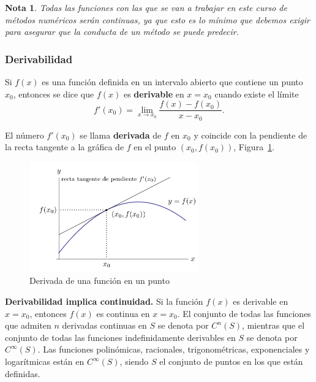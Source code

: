 \documentclass[12pt]{article}
\newtheorem{Note}{Nota}%
\begin{document}
\begin{Note}
Todas las funciones con las que se van a trabajar en este curso de métodos numéricos serán continuas, ya que esto es lo mínimo que debemos exigir para asegurar que la conducta de un método se puede predecir.
\end{Note}

\subsubsection{Derivabilidad}

Si $f(x) $ es una función definida en un intervalo abierto que contiene un punto $x_0 $, entonces se dice que $f(x) $ es \textbf{derivable} en $x = x_0 $ cuando existe el límite
$$f'(x_0) = \lim_{x \to x_0} \frac{f(x) - f(x_0)}{x - x_0}.$$

El número $f'(x_0)$ se llama \textbf{derivada} de $f$ en $x_0$ y coincide con la pendiente de la recta tangente a la gráfica de $f$ en el punto $(x_0, f(x_0))$, Figura~\ref{fig:derivada}.

\begin{figure}[H]
\centering
\includegraphics[width=0.65\textwidth]{Fig2.png}
\caption{Derivada de una función en un punto}
\label{fig:derivada}
\end{figure}

\textbf{Derivabilidad implica continuidad.} Si la función $f(x)$ es derivable en $x = x_0$, entonces $f(x)$ es continua en $x = x_0$. El conjunto de todas las funciones que admiten $n$ derivadas continuas en $S $ se denota por $C^n(S)$, mientras que el conjunto de todas las funciones indefinidamente derivables en $S$ se denota por $C^\infty(S)$. Las funciones polinómicas, racionales, trigonométricas, exponenciales y logarítmicas están en $C^\infty(S)$, siendo $S$ el conjunto de puntos en los que están definidas.
\end{document}

